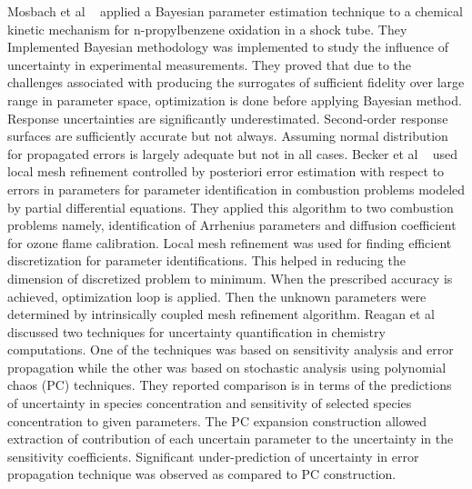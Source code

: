 Mosbach et al ~\cite{mosbac} applied a Bayesian parameter estimation technique to a chemical kinetic mechanism for n-propylbenzene oxidation in a shock tube. They Implemented Bayesian methodology was implemented to study the influence of uncertainty in experimental measurements. They proved that  due to the challenges associated with producing the surrogates of sufficient fidelity over large range in parameter space, optimization is done before applying Bayesian method. Response uncertainties are significantly underestimated. Second-order response surfaces are sufficiently accurate but not always. Assuming normal distribution for propagated errors is largely adequate but not in all cases. Becker et al ~\cite{Becker2005} used local mesh refinement controlled by posteriori error estimation with respect to errors in parameters for parameter identification in combustion problems modeled by partial differential equations. They applied this algorithm to two combustion problems namely, identification of Arrhenius parameters and diffusion coefficient for ozone flame calibration. Local mesh refinement was used for finding efficient discretization for parameter identifications. This helped in reducing the dimension of discretized problem to minimum. When the prescribed accuracy is achieved, optimization loop is applied. Then the unknown parameters were determined by intrinsically coupled mesh refinement algorithm. Reagan et al ~\cite{Reagan} discussed two techniques for uncertainty quantification in chemistry computations. One of the techniques was based on sensitivity analysis and error propagation while the other was based on stochastic analysis using polynomial chaos (PC) techniques. They reported comparison is in terms of the predictions of uncertainty in species concentration and sensitivity of selected species concentration to given parameters. The PC expansion construction allowed extraction of contribution of each uncertain parameter to the uncertainty in the sensitivity coefficients. Significant under-prediction of uncertainty in error propagation technique was observed as compared to PC construction. 


